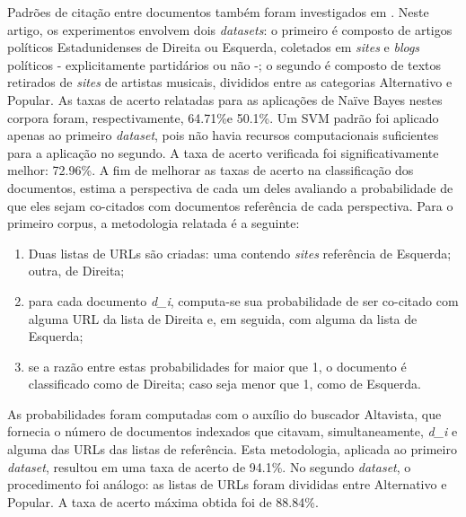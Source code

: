 Padrões de citação entre documentos também foram investigados em \cite{efron}. Neste artigo, os experimentos envolvem dois \emph{datasets}: o primeiro é composto de artigos políticos Estadunidenses de Direita ou Esquerda, coletados em \emph{sites} e \emph{blogs} políticos - explicitamente partidários ou não -; o segundo é composto de textos retirados de \emph{sites} de artistas musicais, divididos entre as categorias Alternativo e Popular. As taxas de acerto relatadas para as aplicações de Naïve Bayes nestes corpora foram, respectivamente, 64.71\%e 50.1\%. Um SVM padrão foi aplicado apenas ao primeiro \emph{dataset}, pois não havia recursos computacionais suficientes para a aplicação no segundo. A taxa de acerto verificada foi significativamente melhor: 72.96\%. A fim de melhorar as taxas de acerto na classificação dos documentos, \cite{efron} estima a perspectiva de cada um deles avaliando a probabilidade de que eles sejam co-citados com documentos referência de cada perspectiva. Para o primeiro corpus, a metodologia relatada é a seguinte:

\begin{enumerate}
  \item Duas listas de URLs são criadas: uma contendo \emph{sites} referência de Esquerda; outra, de Direita;
  \item para cada documento \emph{d\_i}, computa-se sua probabilidade de ser co-citado com alguma URL da lista de Direita e, em seguida, com alguma da lista de Esquerda;
  \item se a razão entre estas probabilidades for maior que 1, o documento é classificado como de Direita; caso seja menor que 1, como de Esquerda.

\end{enumerate}

As probabilidades foram computadas com o auxílio do buscador Altavista, que fornecia o número de documentos indexados que citavam, simultaneamente, \emph{d\_i} e alguma das URLs das listas de referência. Esta metodologia, aplicada ao primeiro \emph{dataset}, resultou em uma taxa de acerto de 94.1\%. No segundo \emph{dataset}, o procedimento foi análogo: as listas de URLs foram divididas entre Alternativo e Popular. A taxa de acerto máxima obtida foi de 88.84\%.

